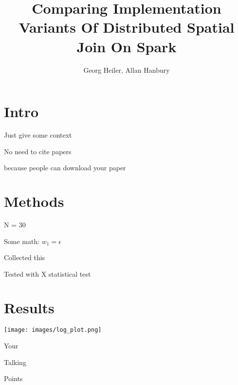 \documentclass[a4paper]{article}
\title{Comparing Implementation Variants Of Distributed Spatial Join On Spark}
\author{Georg Heiler, Allan Hanbury}
\begin{document}





    \raggedcolumns
    \begin{multicols}{2}
        \section{Intro}
        \begin{compactitem}
            \item Just give some context
            \item No need to cite papers
            \item because people can download your paper
        \end{compactitem}
        
        \section{Methods}
        \begin{compactitem}
            \item N = 30
            \item Some math: $w_1 = \epsilon$
            \item Collected this
            \item Tested with X statistical test
        \end{compactitem}
        
    \columnbreak

        \section{Results}
        
        \texttt{[image: images/log\_plot.png]}

        \begin{compactitem}
            \item Your
            \item Talking
            \item Points
        \end{compactitem}
    
    \end{multicols}
\end{document}
